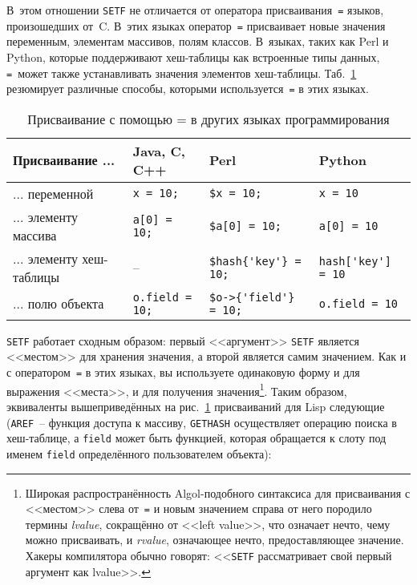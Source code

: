 В~этом отношении \lstinline{SETF} не отличается от оператора присваивания~\lstinline{=} языков,
произошедших от~C. В~этих языках оператор~\lstinline{=} присваивает новые значения переменным,
элементам массивов, полям классов. В~языках, таких как Perl и Python, которые поддерживают
хеш-таблицы как встроенные типы данных, \lstinline{=}~может также устанавливать значения
элементов хеш-таблицы. Таб.~\ref{table:06-1} резюмирует различные способы, которыми
используется~\lstinline{=} в этих языках.

\begin{table}[h]
\begin{tabular}{|m{42mm}|>{\centering}m{23mm}|>{\centering}m{30mm}|>{\centering}m{25mm}|}
\hline
Присваивание ...         & Java, C, C++        & Perl                & Python \\
\hline
... переменной           & \lstinline!x = 10;! & \lstinline!$x = 10;! & \lstinline!x = 10! \\
... элементу массива     & \lstinline!a[0] = 10;! & \lstinline!$a[0] = 10;! & \lstinline!a[0] = 10! \\
... элементу хеш-таблицы & --                  & \lstinline!$hash{'key'} = 10;!  & \lstinline!hash['key'] = 10! \\
... полю объекта         & \lstinline!o.field = 10;! & \lstinline!$o->{'field'} = 10;! & \lstinline!o.field = 10! \\
\hline
\end{tabular}
  \caption{Присваивание с помощью = в других языках программирования} 
  \label{table:06-1}
\end{table}


\lstinline{SETF} работает сходным образом: первый <<аргумент>> \lstinline{SETF} является
<<местом>> для хранения значения, а второй является самим значением. Как и с оператором~\lstinline{=}
в этих языках, вы используете одинаковую форму и для выражения <<места>>, и для
получения значения\footnote{Широкая распространённость Algol-подобного синтаксиса для
  присваивания с <<местом>> слева от~\lstinline{=} и новым значением справа от него породило термины
  \textit{lvalue}, сокращённо от <<left value>>, что означает нечто, чему можно
  присваивать, и \textit{rvalue}, означающее нечто, предоставляющее значение. Хакеры
  компилятора обычно говорят: <<\lstinline{SETF} рассматривает свой первый аргумент как
  lvalue>>.}\hspace{\footnotenegspace}. Таким образом, эквиваленты вышеприведённых на рис.~\ref{table:06-1} присваиваний для
Lisp следующие (\lstinline{AREF}~-- функция доступа к массиву, \lstinline{GETHASH} осуществляет
операцию поиска в хеш-таблице, а \lstinline{field} может быть функцией, которая обращается к слоту под
именем \lstinline{field} определённого пользователем объекта):

